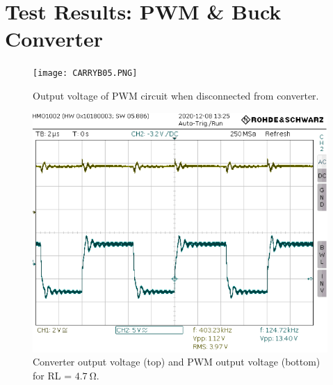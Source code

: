 \section{Test Results: PWM \& Buck Converter}

\begin{figure}
	\centering
	\texttt{[image: CARRYB05.PNG]}
	\caption{Output voltage of PWM circuit when disconnected from converter.}
	\label{fig:test vg}
\end{figure}

\begin{figure}
	\centering
	\includegraphics[width=\linewidth]{"img/test VoVg"}
	\caption{Converter output voltage (top) and PWM output voltage (bottom) for RL = $\SI{4.7}{\ohm}$.}
	\label{fig:test-vovg}
\end{figure}


